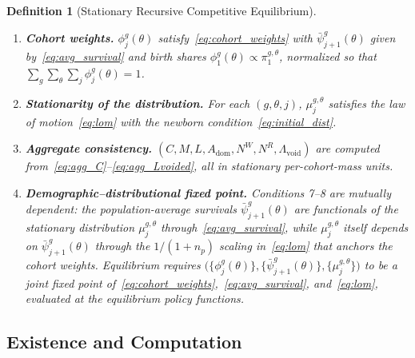 \documentclass[12pt,a4paper]{article}
\newtheorem{definition}{Definition}
\begin{document}
\begin{definition}[Stationary Recursive Competitive Equilibrium]
\begin{enumerate}
\item \textbf{Cohort weights.} $\phi_{j}^{g}(\theta)$ satisfy~\eqref{eq:cohort_weights} with $\bar\psi_{j+1}^{g}(\theta)$ given by~\eqref{eq:avg_survival} and birth shares $\phi_1^{g}(\theta) \propto \pi^{g,\theta}_1$, normalized so that $\sum_g \sum_\theta \sum_j \phi_j^{g}(\theta) = 1$.
\item \textbf{Stationarity of the distribution.} For each $(g, \theta, j)$, $\mu_j^{g,\theta}$ satisfies the law of motion~\eqref{eq:lom} with the newborn condition~\eqref{eq:initial_dist}.
\item \textbf{Aggregate consistency.} $(C, M, L, A_{\mathrm{dom}}, N^W, N^R, \Lambda_{\mathrm{void}})$ are computed from~\eqref{eq:agg_C}--\eqref{eq:agg_Lvoided}, all in stationary per-cohort-mass units.
\item \textbf{Demographic--distributional fixed point.} Conditions 7--8 are mutually dependent: the population-average survivals $\bar\psi^{g}_{j+1}(\theta)$ are functionals of the stationary distribution $\mu^{g,\theta}_j$ through~\eqref{eq:avg_survival}, while $\mu^{g,\theta}_j$ itself depends on $\bar\psi^{g}_{j+1}(\theta)$ through the $1/(1+n_p)$ scaling in~\eqref{eq:lom} that anchors the cohort weights. Equilibrium requires $\bigl(\{\phi^{g}_j(\theta)\}, \{\bar\psi^{g}_{j+1}(\theta)\}, \{\mu^{g,\theta}_j\}\bigr)$ to be a joint fixed point of~\eqref{eq:cohort_weights},~\eqref{eq:avg_survival}, and~\eqref{eq:lom}, evaluated at the equilibrium policy functions.
\end{enumerate}
\end{definition}

\subsection{Existence and Computation}
\label{subsec:existence}
\end{document}
